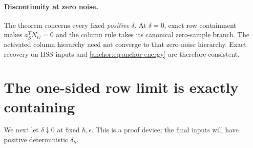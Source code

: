 \documentclass[11pt,oneside,openany,a4paper]{book}
\numberwithin{equation}{chapter}
\theoremstyle{definition}
\theoremstyle{remark}
\begin{document}
\paragraph{Discontinuity at zero noise.}
The theorem concerns every fixed \emph{positive} $\delta$. At $\delta=0$, exact row containment makes $a_S^TN_G=0$ and the column rule takes its canonical zero-sample branch. The activated column hierarchy need not converge to that zero-noise hierarchy. Exact recovery on HSS inputs and \eqref{anchor:eq:anchor-energy} are therefore consistent.

\section{The one-sided row limit is exactly containing}\label{anchor:sec:limit}
We next let $\delta\downarrow0$ at fixed $h,\epsilon$. This is a proof device; the final inputs will have positive deterministic $\delta_h$.
\end{document}

